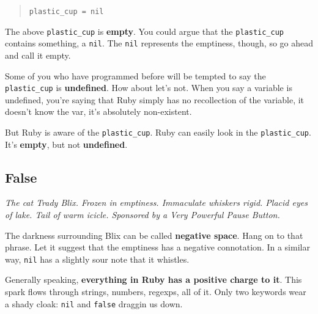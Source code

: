 \documentclass[10pt,twoside]{report}
\begin{document}
\begin{quote}
\lstinline[breaklines=true]|plastic_cup = nil|\end{quote}


The above \lstinline[breaklines=true]|plastic_cup| is {\bf empty}.
You could argue that the \lstinline[breaklines=true]|plastic_cup|
contains something, a \lstinline[breaklines=true]|nil|.  The
\lstinline[breaklines=true]|nil| represents the emptiness, though, so
go ahead and call it empty.

Some of you who have programmed before will be tempted to say the
\lstinline[breaklines=true]|plastic_cup| is {\bf undefined}.  How
about let's not.  When you say a variable is undefined, you're saying
that Ruby simply has no recollection of the variable, it doesn't know
the var, it's absolutely non-existent.

But Ruby is aware of the \lstinline[breaklines=true]|plastic_cup|.
Ruby can easily look in the
\lstinline[breaklines=true]|plastic_cup|. It's {\bf empty}, but not
          {\bf undefined}.

\newpage



\subsection{False}




{\em The cat Trady Blix.  Frozen in emptiness.  Immaculate whiskers
  rigid.  Placid eyes of lake.  Tail of warm icicle.  Sponsored by a
  Very Powerful Pause Button.}

The darkness surrounding Blix can be called {\bf negative space}.
Hang on to that phrase. Let it suggest that the emptiness has a
negative connotation.  In a similar way,
\lstinline[breaklines=true]|nil| has a slightly sour note that it
whistles.

Generally speaking, {\bf everything in Ruby has a positive charge to
  it}.  This spark flows through strings, numbers, regexps, all of it.
Only two keywords wear a shady cloak: \lstinline[breaklines=true]|nil|
and \lstinline[breaklines=true]|false| draggin us down.
\end{document}
